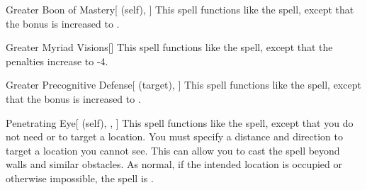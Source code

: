 \lowercase{\hypertarget{spell:Greater Boon of Mastery}{}}\label{spell:Greater Boon of Mastery}
\begin{attuneability}[Rank 5]{\hypertarget{spell:Greater Boon of Mastery}{Greater Boon of Mastery}}[ (self), ]
This spell functions like the  spell, except that the bonus is increased to .
\end{attuneability}
\vspace{0.25em}



\lowercase{\hypertarget{spell:Greater Myriad Visions}{}}\label{spell:Greater Myriad Visions}
\begin{freeability}[Rank 5]{\hypertarget{spell:Greater Myriad Visions}{Greater Myriad Visions}}[]
This spell functions like the  spell, except that the penalties increase to -4.
\end{freeability}
\vspace{0.25em}



\lowercase{\hypertarget{spell:Greater Precognitive Defense}{}}\label{spell:Greater Precognitive Defense}
\begin{attuneability}[Rank 5]{\hypertarget{spell:Greater Precognitive Defense}{Greater Precognitive Defense}}[ (target), ]
This spell functions like the  spell, except that the bonus is increased to .
\end{attuneability}
\vspace{0.25em}



\lowercase{\hypertarget{spell:Penetrating Eye}{}}\label{spell:Penetrating Eye}
\begin{attuneability}[Rank 5]{\hypertarget{spell:Penetrating Eye}{Penetrating Eye}}[ (self), , ]
This spell functions like the  spell, except that you do not need  or  to target a location.
You must specify a distance and direction to target a location you cannot see.
This can allow you to cast the spell beyond walls and similar obstacles.
As normal, if the intended location is occupied or otherwise impossible, the spell is .
\end{attuneability}
\vspace{0.25em}




